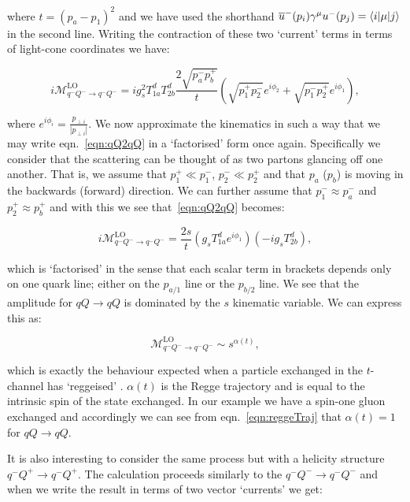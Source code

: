 		where $t = (p_a - p_1)^2$ and we have used the shorthand
		$\overline{u}^-(p_i)\gamma^\mu u^-(p_j) = \langle i | \mu | j \rangle$ in the second line.
		Writing the contraction of these two `current' terms in terms of light-cone coordinates we have:

		\begin{equation}
			i\mathcal{M}_{q^-Q^-\rightarrow q^-Q^-}^{\text{LO}} = ig_s^2T^d_{1a}T^d_{2b}
			\frac{2\sqrt{p_a^-p_b^+}}{t}
			\left(\sqrt{p_1^+p_2^-}e^{i\phi_2} + \sqrt{p_1^-p_2^+}e^{i\phi_1}\right),
			\label{eqn:qQ2qQ}
		\end{equation}

		where $e^{i\phi_i} = \frac{p_{\perp i}}{|p_{\perp i}|}$.  We now approximate the kinematics
		in such a way that we may write eqn.~\eqref{eqn:qQ2qQ} in a `factorised' form once again.
		Specifically we consider that the scattering can be thought of as two partons glancing off
		one another.  That is, we assume that $p_1^+\ll p_1^-$, $p_2^-\ll p_2^+$ and that $p_a$ ($p_b$)
		is moving in the backwards (forward) direction.  We can further assume that $p_1^-\approx p_a^-$
		and $p_2^+\approx p_b^+$ and with this we see that~\eqref{eqn:qQ2qQ} becomes:

		\begin{equation}
			i\mathcal{M}_{q^-Q^-\rightarrow q^-Q^-}^{\text{LO}} =
			\frac{2s}{t}\left(g_sT^d_{1a}e^{i\phi_1}\right)\left(-ig_sT^d_{2b}\right),
			\label{eqn:reggeTraj}
		\end{equation}

		which is `factorised' in the sense that each scalar term in brackets depends only on one
		quark line; either on the $p_{a/1}$ line or the $p_{b/2}$ line.  We see that the amplitude
		for $qQ\rightarrow qQ$ is dominated by the $s$ kinematic variable.  We can express this as:

		\begin{equation}
			\mathcal{M}_{q^-Q^-\rightarrow q^-Q^-}^{\text{LO}} \sim s^{\alpha(t)},
		\end{equation}

		which is exactly the behaviour expected when a particle exchanged in the $t$-channel has `reggeised'
		\cite{sabioThesis,DelDuca:1995hf,lipatovBook}.  $\alpha(t)$ is the Regge trajectory and is equal to
		the intrinsic spin of the state exchanged.  In our example we have a spin-one gluon exchanged
		and accordingly we can see from eqn.~\eqref{eqn:reggeTraj} that $\alpha(t)=1$ for $qQ\rightarrow qQ$.

		It is also interesting to consider the same process but with a helicity structure $q^-Q^+\to q^-Q^+$.
		The calculation proceeds similarly to the $q^-Q^-\to q^-Q^-$ and when we write the result in
		terms of two vector `currents' we get:

